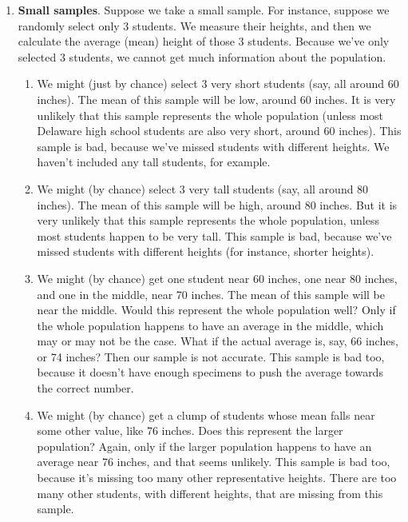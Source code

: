 \documentclass[../../../main.tex]{subfiles}
\begin{document}
\begin{enumerate}

  \item \textbf{Small samples}. Suppose we take a small sample. For instance, suppose we randomly select only 3 students. We measure their heights, and then we calculate the average (mean) height of those 3 students. Because we've only selected 3 students, we cannot get much information about the population.
  
  \begin{enumerate}
  
    \item We might (just by chance) select 3 very short students (say, all around 60 inches). The mean of this sample will be low, around 60 inches. It is very unlikely that this sample represents the whole population (unless most Delaware high school students are also very short, around 60 inches). This sample is bad, because we've missed students with different heights. We haven't included any tall students, for example.
    
    \item We might (by chance) select 3 very tall students (say, all around 80 inches). The mean of this sample will be high, around 80 inches. But it is very unlikely that this sample represents the whole population, unless most students happen to be very tall. This sample is bad, because we've missed students with different heights (for instance, shorter heights).
    
    \item We might (by chance) get one student near 60 inches, one near 80 inches, and one in the middle, near 70 inches. The mean of this sample will be near the middle. Would this represent the whole population well? Only if the whole population happens to have an average in the middle, which may or may not be the case. What if the actual average is, say, 66 inches, or 74 inches? Then our sample is not accurate. This sample is bad too, because it doesn't have enough specimens to push the average towards the correct number.
    
    \item We might (by chance) get a clump of students whose mean falls near some other value, like 76 inches. Does this represent the larger population? Again, only if the larger population happens to have an average near 76 inches, and that seems unlikely. This sample is bad too, because it's missing too many other representative heights. There are too many other students, with different heights, that are missing from this sample.
  

\end{enumerate}
\end{enumerate}
\end{document}
